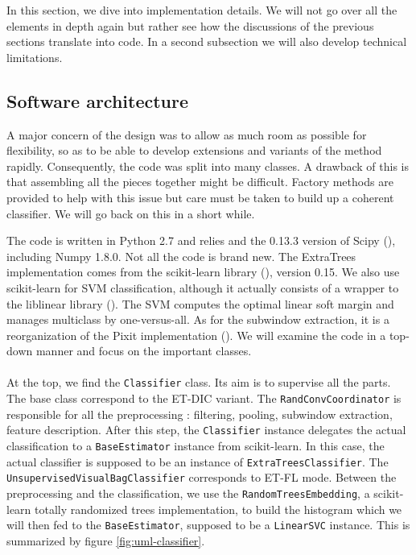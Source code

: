 \documentclass[a4paper]{report}
\begin{document}
	In this section, we dive into implementation details. We will not go over all the elements in depth again but rather see how the discussions of the previous sections translate into code. In a second subsection we will also develop technical limitations.
		\subsection{Software architecture}
		A major concern of the design was to allow as much room as possible for flexibility, so as to be able to develop extensions and variants of the method rapidly. Consequently, the code was split into many classes. A drawback of this is that assembling all the pieces together might be difficult. Factory methods are provided to help with this issue but care must be taken to build up a coherent classifier. We will go back on this in a short while. 
		\par
		The code is written in Python 2.7 and relies and the 0.13.3 version of Scipy (\cite{scipy}), including Numpy 1.8.0. Not all the code is brand new. The ExtraTrees implementation comes from the scikit-learn library (\cite{sklearn}), version 0.15. We also use scikit-learn for SVM classification, although it actually consists of a wrapper to the liblinear library (\cite{liblinear}). The SVM computes the optimal linear soft margin and manages multiclass by one-versus-all.
				As for the subwindow extraction, it is a reorganization of the Pixit implementation (\cite{cytomine}).
		We will examine the code in a top-down manner and focus on the important classes.
		\paragraph{}
		At the top, we find the \texttt{Classifier} class. Its aim is to supervise all the parts. The base class correspond to the ET-DIC variant. The \texttt{RandConvCoordinator} is responsible for all the preprocessing : filtering, pooling, subwindow extraction, feature description. After this step, the \texttt{Classifier} instance delegates the actual classification to a \texttt{BaseEstimator} instance from scikit-learn. In this case, the actual classifier is supposed to be an instance of \texttt{ExtraTreesClassifier}. The \texttt{UnsupervisedVisualBagClassifier} corresponds to ET-FL mode. Between the preprocessing and the classification, we use the \texttt{RandomTreesEmbedding}, a scikit-learn totally randomized trees implementation, to build the histogram which we will then fed to the \texttt{BaseEstimator}, supposed to be a \texttt{LinearSVC} instance.
		This is summarized by figure \ref{fig:uml-classifier}.
		
\end{document}
